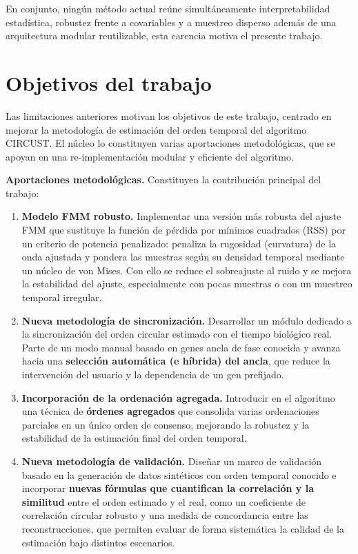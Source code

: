 \documentclass[12pt, a4paper]{report}
\begin{document}
En conjunto, ningún método actual reúne simultáneamente interpretabilidad estadística, robustez frente a covariables y a muestreo disperso además de una arquitectura modular reutilizable, esta carencia motiva el presente trabajo.

\section{Objetivos del trabajo}

Las limitaciones anteriores motivan los objetivos de este trabajo, centrado en mejorar la metodología de estimación del orden temporal del algoritmo CIRCUST. El núcleo lo constituyen varias aportaciones metodológicas, que se apoyan en una re-implementación modular y eficiente del algoritmo.

\textbf{Aportaciones metodológicas.} Constituyen la contribución principal del trabajo:
\begin{enumerate}
    \item \textbf{Modelo FMM robusto.} Implementar una versión más robusta del ajuste FMM que sustituye la función de pérdida por mínimos cuadrados (RSS) por un criterio de potencia penalizado: penaliza la rugosidad (curvatura) de la onda ajustada y pondera las muestras según su densidad temporal mediante un núcleo de von Mises. Con ello se reduce el sobreajuste al ruido y se mejora la estabilidad del ajuste, especialmente con pocas muestras o con un muestreo temporal irregular.

    \item \textbf{Nueva metodología de sincronización.} Desarrollar un módulo dedicado a la sincronización del orden circular estimado con el tiempo biológico real. Parte de un modo manual basado en genes ancla de fase conocida y avanza hacia una \textbf{selección automática (e híbrida) del ancla}, que reduce la intervención del usuario y la dependencia de un gen prefijado.

    \item \textbf{Incorporación de la ordenación agregada.} Introducir en el algoritmo una técnica de \textbf{órdenes agregados} que consolida varias ordenaciones parciales en un único orden de consenso, mejorando la robustez y la estabilidad de la estimación final del orden temporal.

    \item \textbf{Nueva metodología de validación.} Diseñar un marco de validación basado en la generación de datos sintéticos con orden temporal conocido e incorporar \textbf{nuevas fórmulas que cuantifican la correlación y la similitud} entre el orden estimado y el real, como un coeficiente de correlación circular robusto y una medida de concordancia entre las reconstrucciones, que permiten evaluar de forma sistemática la calidad de la estimación bajo distintos escenarios.
\end{enumerate}
\end{document}
